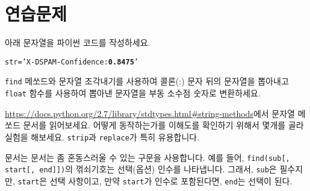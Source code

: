 \section{연습문제}

\begin{ex}
아래 문자열을 파이썬 코드를 작성하세요.

\beforeverb
\begin{alltt}
str = 'X-DSPAM-Confidence: {\bf 0.8475}'
\end{alltt}
\afterverb

{\tt find} 메쏘드와 문자열 조각내기를 사용하여 콜론(:) 문자 뒤의 문자열을 뽑아내고 
{\tt float} 함수를 사용하여 뽑아낸 문자열을 부동 소수점 숫자로 변환하세요.

\end{ex}


\begin{ex}

\url{https://docs.python.org/2.7/library/stdtypes.html#string-methods}에서 문자열 메쏘드 문서를 읽어보세요.
어떻게 동작하는가를 이해도를 확인하기 위해서 몇개를 골라 실험을 해보세요.
{\tt strip}과 {\tt replace}가 특히 유용합니다.

문서는 
문서는 좀 혼동스러울 수 있는 구문을 사용합니다.
예를 들어, \verb"find(sub[, start[, end]])"의 꺾쇠기호는 선택(옵션) 인수를 나타냅니다.
그래서, {\tt sub}은 필수지만, {\tt start}은 선택 사항이고, 만약 {\tt start}가 인수로 포함된다면, {\tt end}는 선택이 된다.  
\end{ex}

